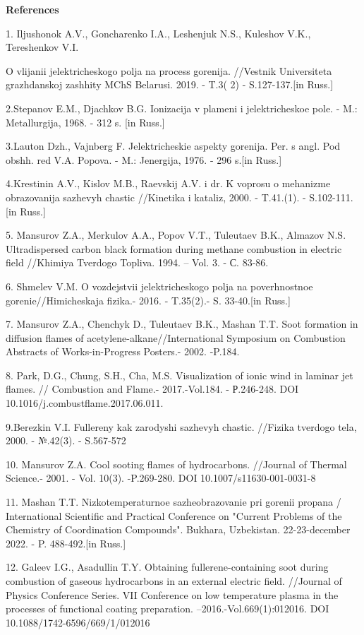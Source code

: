 \begin{center}
{\bfseries References}
\end{center}

\begin{noparindent}
1. Il\textquotesingle jushonok A.V., Goncharenko I.A., Leshenjuk N.S.,
Kuleshov V.K., Tereshenkov V.I.

O vlijanii jelektricheskogo polja na process gorenija. //Vestnik
Universiteta grazhdanskoj zashhity MChS Belarusi. 2019. - T.3( 2) -
S.127-137.{[}in Russ.{]}

2.Stepanov E.M., D\textquotesingle jachkov B.G. Ionizacija v plameni i
jelektricheskoe pole. - M.: Metallurgija, 1968. - 312 s. {[}in Russ.{]}

3.Lauton Dzh., Vajnberg F. Jelektricheskie aspekty gorenija. Per. s
angl. Pod obshh. red V.A. Popova. - M.: Jenergija, 1976. - 296 s.{[}in
Russ.{]}

4.Krestinin A.V., Kislov M.B., Raevskij A.V. i dr. K voprosu o mehanizme
obrazovanija sazhevyh chastic //Kinetika i kataliz, 2000. - T.41.(1). -
S.102-111. {[}in Russ.{]}

5. Mansurov Z.A., Merkulov A.A., Popov V.T., Tuleutaev B.K., Almazov
N.S. Ultradispersed carbon black formation during methane combustion in
electric field //Khimiya Tverdogo Topliva. 1994. -- Vol. 3. - С. 83-86.

6. Shmelev V.M. O vozdejstvii jelektricheskogo polja na poverhnostnoe
gorenie//Himicheskaja fizika.- 2016. - T.35(2).- S. 33-40.{[}in Russ.{]}

7. Mansurov Z.A., Chenchyk D., Tuleutaev B.K., Mashan T.T. Soot
formation in diffusion flames of acetylene-alkane//International
Symposium on Combustion Abstracts of Works-in-Progress Posters.- 2002.
-P.184.

8. Park, D.G., Chung, S.H., Cha, M.S. Visualization of ionic wind in
laminar jet flames. // Combustion and Flame.- 2017.-Vol.184. -
Р.246-248. DOI 10.1016/j.combustflame.2017.06.011.

9.Berezkin V.I. Fullereny kak zarodyshi sazhevyh chastic. //Fizika
tverdogo tela, 2000. - №.42(3). - S.567-572

10. Mansurov Z.A. Cool sooting flames of hydrocarbons. //Journal of
Thermal Science.- 2001. - Vol. 10(3). -P.269-280. DOI
10.1007/s11630-001-0031-8

11. Mashan T.T. Nizkotemperaturnoe sazheobrazovanie pri gorenii propana
/ International Scientific and Practical Conference on "Current Problems
of the Chemistry of Coordination Compounds". Bukhara, Uzbekistan.
22-23-december 2022. - P. 488-492.{[}in Russ.{]}

12. Galeev I.G., Asadullin T.Y. Obtaining fullerene-containing soot
during combustion of gaseous hydrocarbons in an external electric field.
//Journal of Physics Conference Series. VII Conference on low
temperature plasma in the processes of functional coating preparation.
--2016.-Vol.669(1):012016. DOI 10.1088/1742-6596/669/1/012016
\end{noparindent}

